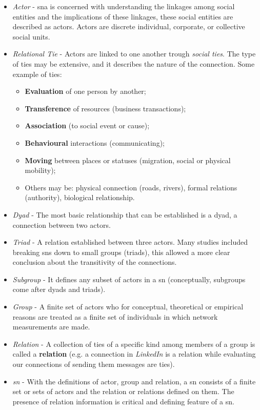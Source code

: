 \begin{itemize}
    \item \emph{Actor} - \gls{sna} is concerned with understanding the linkages among social entities and the implications of these linkages, these social entities are described as actors. Actors are  discrete individual, corporate, or collective social units.
    \item \emph{Relational Tie} - Actors are linked to one another trough \textit{social ties}. The type of ties may be extensive, and it describes the nature of the connection. Some example of ties:
        \begin{itemize}
            \item \textbf{Evaluation} of one person by another;
            \item \textbf{Transference} of resources (business transactions);
            \item \textbf{Association} (to social event or cause);
            \item \textbf{Behavioural} interactions (communicating);
            \item \textbf{Moving} between places or statuses (migration, social or physical mobility);
            \item Others may be: physical connection (roads, rivers), formal relations (authority), biological relationship.
        \end{itemize}
    \item \emph{Dyad} - The most basic relationship that can be established is a dyad, a connection between two actors.
    \item \emph{Triad} - A relation established between three actors. Many studies included breaking \glspl{sn} down to small groups (triads), this allowed a more clear conclusion about the transitivity of the connections.
    \item \emph{Subgroup} - It defines any subset of actors in a \gls{sn} (conceptually, subgroups come after dyads and triads).
    \item \emph{Group} - A finite set of actors who for conceptual, theoretical or empirical reasons are treated as a finite set of individuals in which network measurements are made.
    \item \emph{Relation} - A collection of ties of a specific kind among members of a group is called a \textbf{relation} (e.g. a connection in \textit{LinkedIn} is a relation while evaluating our connections of sending them messages are ties).
    \item \emph{\gls{sn}} - With the definitions of actor, group and relation, a \gls{sn} consists of a finite set or sets of actors and the relation or relations defined on them. The presence of relation information is critical and defining feature of a \gls{sn}.
\end{itemize}

